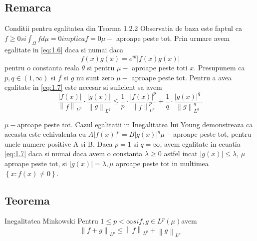 \documentclass[a4paper,12pt,oneside]{report}
\begin{document}
\subsection{Remarca}

Conditii pentru egalitatea din Teorma 1.2.2
Observatia de baza este faptul ca  \(f\geq 0 si \int_{\Omega }f d\mu  = 0 implica f = 0 \mu-\) aproape peste tot. 
	Prin urmare avem egalitate in \ref{eq:1.6} daca si numai daca 
\begin{displaymath}
  f\left ( x \right )g\left ( x \right ) = e^{i\theta }\left | f\left ( x \right ) g\left ( x \right )\right |
\end{displaymath}
pentru o constanta reala \(\theta\) si pentru \(\mu-\) aproape peste toti \(x\). 
	Presupunem ca \(p , q \in \left ( 1 , \infty  \right )\) si \(f\) si \(g\) nu sunt zero \(\mu-\) aproape peste tot. Pentru a avea egalitate in \ref{eq:1.7} este necesar si suficient sa avem 
\begin{displaymath}
  \frac{\left | f\left ( x \right ) \right |}{\left \| f \right \|_{L^{p}}} \cdot \frac{\left | g\left ( x \right ) \right |}{\left \| g \right \|_{L^{q}}}\leq \frac{1}{p}\cdot \frac{\left | f\left ( x \right ) \right |^{p}}{\left \| f \right \|^{p}_{L^{p}}} + \frac{1}{q}\cdot \frac{\left | g\left ( x \right ) \right |^{q}}{\left \| g \right \|^{q}_{L^{q}}}. 
\end{displaymath}

\(\mu-\)aproape peste tot. Cazul egalitatii in Inegalitatea lui Young demonstreaza ca aceasta este echivalenta cu \(A\left | f\left ( x \right ) \right |^{p} = B\left | g\left ( x \right ) \right |^{q} \mu-\)aproape peste tot,
pentru unele numere positive A si B. 
	Daca \(p = 1\) si \(q = \infty\), avem egalitate in ecuatia \ref{eq:1.7} daca si numai daca avem o constanta \(\lambda \geq 0\) astfel incat \(\left | g\left ( x \right ) \right |\leq \lambda\),  \(\mu\) aproape peste tot, si \(\left | g\left ( x \right ) \right |= \lambda,  \mu\) aproape peste tot in multimea \(\left \{ x : f\left ( x \right )\neq 0 \right \}\). 

\subsection{Teorema}
Inegalitatea Minkowski
Pentru \(1\leq  p < \infty si f , g \in L^{p}\left ( \mu  \right ) \)avem
\begin{displaymath}
  \left \| f + g  \right \|_{L^{p}}\leq \left \| f \right \|_{L^{p}} + \left \| g \right \|_{L^{p}} \label{eq:1.10} \tag{1.10}
\end{displaymath}
\end{document}
